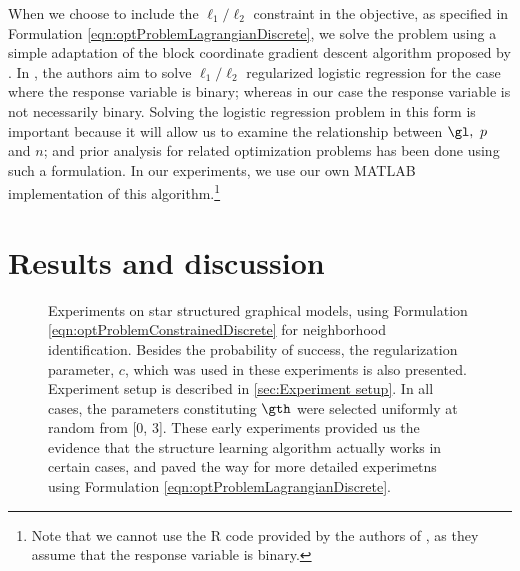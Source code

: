 \documentclass{article}
\begin{document}
When we choose to include the $\ell_1/\ell_2$ constraint in the objective, as specified in Formulation \ref{eqn:optProblemLagrangianDiscrete}, we solve the problem using a simple adaptation of the block coordinate gradient descent algorithm proposed by \citet{meierRS2008}. In \citet{meierRS2008}, the authors aim to solve $\ell_1/\ell_2$ regularized logistic regression for the case where the response variable is binary; whereas in our case the response variable is not necessarily binary. Solving the logistic regression problem in this form is important because it will allow us to examine the relationship between $\gl,\ p$ and $n$; and prior analysis for related optimization problems has been done using such a formulation. In our experiments, we use our own MATLAB implementation of this algorithm.\footnote{Note that we cannot use the R code provided by the authors of \citet{meierRS2008}, as they assume that the response variable is binary.}


\section{Results and discussion}
\label{sec:Results and discussion}
\begin{figure}[h]
  \begin{center}
    
    
    
  \end{center}
  \caption{Experiments on star structured graphical models, using Formulation \ref{eqn:optProblemConstrainedDiscrete} for neighborhood identification. Besides the probability of success, the regularization parameter, $c$, which was used in these experiments is also presented. Experiment setup is described in \ref{sec:Experiment setup}. In all cases, the parameters constituting $\gth$ were selected uniformly at random from [0, 3]. These early experiments provided us the evidence that the structure learning algorithm actually works in certain cases, and paved the way for more detailed experimetns using Formulation \ref{eqn:optProblemLagrangianDiscrete}.}
  \label{fig:optProblemConstrained}
\end{figure}
\end{document}
